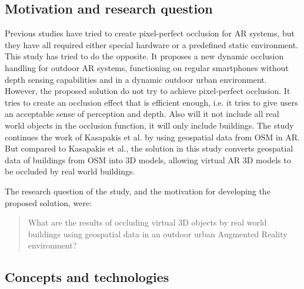 \subsection{Motivation and research question}
Previous studies have tried to create pixel-perfect occlusion for AR systems, but they have all required either special hardware or a predefined static environment. This study has tried to do the opposite. It proposes a new dynamic occlusion handling for outdoor AR systems, functioning on regular smartphones without depth sensing capabilities and in a dynamic outdoor urban environment. However, the proposed solution do not try to achieve pixel-perfect occlusion. It tries to create an occlusion effect that is efficient enough, i.e. it tries to give users an acceptable sense of perception and depth. Also will it not include all real world objects in the occlusion function, it will only include buildings. The study continues the work of Kasapakis et al. \cite{kasapakis2015determining} by using geospatial data from OSM in AR. But compared to Kasapakis et al., the solution in this study converts geospatial data of buildings from OSM into 3D models, allowing virtual AR 3D models to be occluded by real world buildings.  

The research question of the study, and the motivation for developing the proposed solution, were:
\begin{quote}
What are the results of occluding virtual 3D objects by real world buildings using geospatial data in an outdoor urban Augmented Reality environment?
\end{quote}

\subsection{Concepts and technologies}
